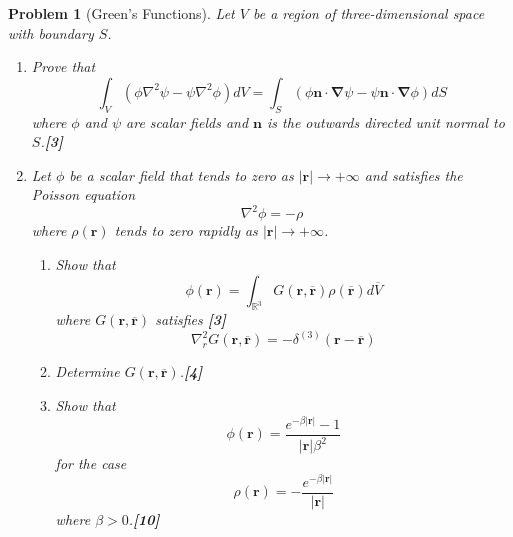 \documentclass[a4paper]{article}
\theoremstyle{new}
\newtheorem{qns}{Problem}[section]
\begin{document}
\newpage
\begin{qns}[Green's Functions]
Let $V$ be a region of three-dimensional space with boundary $S$.
\begin{enumerate}[label=(\alph*)]
\item Prove that
$$\int_V(\phi\nabla^2\psi-\psi\nabla^2\phi)dV=\int_S(\phi\mathbf{n}\cdot\boldsymbol{\nabla}\psi-\psi\mathbf{n}\cdot\boldsymbol{\nabla}\phi)dS$$
where $\phi$ and $\psi$  are scalar fields and $\mathbf{n}$ is the outwards directed unit normal to $S$.\hfill\textbf{[3]}
\item Let $\phi$ be a scalar field that tends to zero as $|\mathbf{r}|\rightarrow+\infty$ and satisfies the Poisson equation
$$\nabla^2\phi=-\rho$$
where $\rho(\mathbf{r})$ tends to zero rapidly as $|\mathbf{r}|\rightarrow+\infty$.
\begin{enumerate}[label=(\roman*)]
\item Show that
$$\phi(\mathbf{r})=\int_{\mathbb{R}^3}G(\mathbf{r},\mathbf{\overline{r}})\rho(\mathbf{\overline{r}})d\overline{V}$$
where $G(\mathbf{r},\mathbf{\overline{r}})$ satisfies \hfill\textbf{[3]}
$$\nabla_r^2G(\mathbf{r},\mathbf{\overline{r}})=-\delta^{(3)}(\mathbf{r}-\mathbf{\overline{r}})$$
\item Determine $G(\mathbf{r},\mathbf{\overline{r}})$.\hfill\textbf{[4]}
\item Show that
$$\phi(\mathbf{r})=\frac{e^{-\beta|\mathbf{r}|}-1}{|\mathbf{r}|\beta^2}$$
for the case
$$\rho(\mathbf{r})=-\frac{e^{-\beta|\mathbf{r}|}}{|\mathbf{r}|}$$
where $\beta>0$.\hfill\textbf{[10]}
\end{enumerate}
\end{enumerate}
\end{qns}
\end{document}
